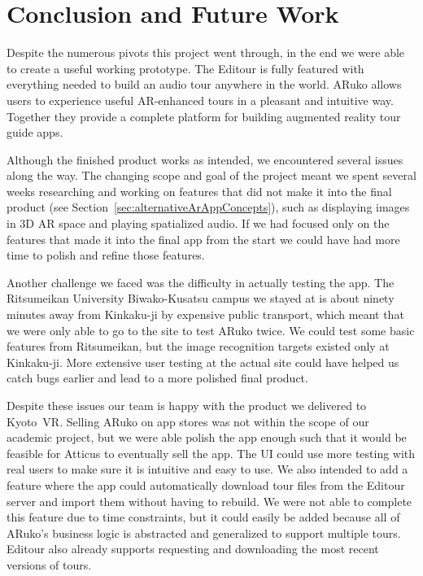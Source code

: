 \documentclass[a4paper, 10pt, american, titlepage]{article}
\begin{document}
\section{Conclusion and Future Work}
\label{sec:conclusionAndFutureWork}

Despite the numerous pivots this project went through, in the end we were able
to create a useful working prototype. The Editour is fully featured with
everything needed to build an audio tour anywhere in the world. ARuko allows
users to experience useful AR-enhanced tours in a pleasant and intuitive way.
Together they provide a complete platform for building augmented reality tour
guide apps.

Although the finished product works as intended, we encountered several issues
along the way. The changing scope and goal of the project meant we spent
several weeks researching and working on features that did not make it into the
final product (see Section~\ref{sec:alternativeArAppConcepts}), such as
displaying images in 3D AR space and playing spatialized audio. If we had
focused only on the features that made it into the final app from the start we
could have had more time to polish and refine those features.

Another challenge we faced was the difficulty in actually testing the app. The
Ritsumeikan University Biwako-Kusatsu campus we stayed at is about ninety
minutes away from Kinkaku-ji by expensive public transport, which meant that we
were only able to go to the site to test ARuko twice. We could test some basic
features from Ritsumeikan, but the image recognition targets existed only at
Kinkaku-ji. More extensive user testing at the actual site could have helped us
catch bugs earlier and lead to a more polished final product.

Despite these issues our team is happy with the product we delivered to
Kyoto~VR. Selling ARuko on app stores was not within the scope of our academic
project, but we were able polish the app enough such that it would be feasible
for Atticus to eventually sell the app. The UI could use more testing with real
users to make sure it is intuitive and easy to use. We also intended to add a
feature where the app could automatically download tour files from the Editour
server and import them without having to rebuild. We were not able to complete
this feature due to time constraints, but it could easily be added because all
of ARuko's business logic is abstracted and generalized to support multiple
tours. Editour also already supports requesting and downloading the most recent
versions of tours.
\end{document}
